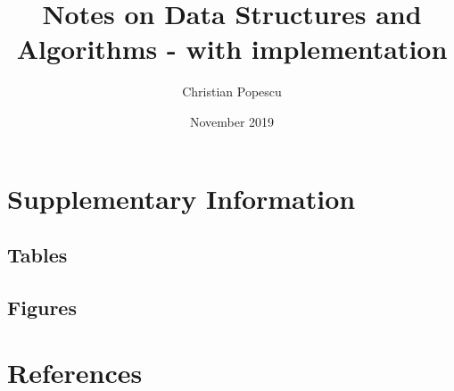 \documentclass[a4paper,12pt]{book}
\begin{document}
\author{Christian Popescu}
\title{Notes on Data Structures and Algorithms - with implementation}
\date{November 2019}

\frontmatter
\maketitle
\tableofcontents
\setcounter{secnumdepth}{5}

\mainmatter













\backmatter
\begin{appendices}
	
	\chapter{Supplementary Information}
	
	\section{Tables}
	
	\section{Figures}
	
	\chapter{References}
	
\printbibliography
	
%	
	
\end{appendices}
\end{document}
